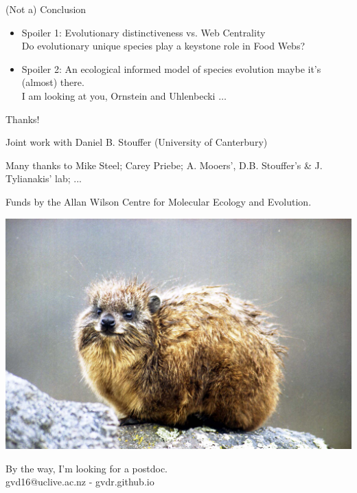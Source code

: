\documentclass[]{beamer}
\begin{document}
\begin{frame}{(Not a) Conclusion}

\begin{itemize}[<+->]
\item
  Spoiler 1: Evolutionary distinctiveness vs. Web Centrality\\
  {\small Do evolutionary unique species play a keystone role in Food Webs?}
\item
  Spoiler 2: An ecological informed model of species evolution maybe
  it's (almost) there.\\
  {\small I am looking at you, Ornstein and Uhlenbecki $\dots$}
\end{itemize}

\end{frame}

\begin{frame}{Thanks!}

\begin{centering}
\small{
Joint work with  
Daniel B. Stouffer (University of Canterbury)

Many thanks to  
Mike Steel; Carey Priebe; A. Mooers', D.B. Stouffer's \& J. Tylianakis' lab; ...

Funds by the Allan Wilson Centre for Molecular Ecology and Evolution.}

\centering
  \includegraphics[width=0.4\linewidth]{images/hyrax.jpg}

\small{By the way, I'm looking for a postdoc.\\ gvd16@uclive.ac.nz - gvdr.github.io}

\end{centering}

\end{frame}
\end{document}
